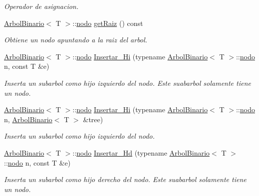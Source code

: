 \begin{DoxyCompactItemize}
\begin{DoxyCompactList}\small\item\em Operador de asignacion. \end{DoxyCompactList}\item 
\mbox{\label{classArbolBinario_a8ced95c7eae98ffd79eb46dcc99df523}} 
\hyperlink{classArbolBinario}{Arbol\+Binario}$<$ T $>$\+::\hyperlink{classArbolBinario_1_1nodo}{nodo} \hyperlink{classArbolBinario_a8ced95c7eae98ffd79eb46dcc99df523}{get\+Raiz} () const
\begin{DoxyCompactList}\small\item\em Obtiene un nodo apuntando a la raiz del arbol. \end{DoxyCompactList}\item 
\hyperlink{classArbolBinario}{Arbol\+Binario}$<$ T $>$\+::\hyperlink{classArbolBinario_1_1nodo}{nodo} \hyperlink{classArbolBinario_a82155da74eeeac7e52b9b0cc2f2d05f2}{Insertar\+\_\+\+Hi} (typename \hyperlink{classArbolBinario}{Arbol\+Binario}$<$ T $>$\+::\hyperlink{classArbolBinario_1_1nodo}{nodo} n, const T \&e)
\begin{DoxyCompactList}\small\item\em Inserta un subarbol como hijo izquierdo del nodo. Este suabarbol solamente tiene un nodo. \end{DoxyCompactList}\item 
\hyperlink{classArbolBinario}{Arbol\+Binario}$<$ T $>$\+::\hyperlink{classArbolBinario_1_1nodo}{nodo} \hyperlink{classArbolBinario_aa917f4b80d735b3494e1793de9457fb4}{Insertar\+\_\+\+Hi} (typename \hyperlink{classArbolBinario}{Arbol\+Binario}$<$ T $>$\+::\hyperlink{classArbolBinario_1_1nodo}{nodo} n, \hyperlink{classArbolBinario}{Arbol\+Binario}$<$ T $>$ \&tree)
\begin{DoxyCompactList}\small\item\em Inserta un subarbol como hijo izquierdo del nodo. \end{DoxyCompactList}\item 
\hyperlink{classArbolBinario}{Arbol\+Binario}$<$ T $>$\+::\hyperlink{classArbolBinario_1_1nodo}{nodo} \hyperlink{classArbolBinario_a1896b66e7b38f98ea4010e131998f376}{Insertar\+\_\+\+Hd} (typename \hyperlink{classArbolBinario}{Arbol\+Binario}$<$ T $>$\+::\hyperlink{classArbolBinario_1_1nodo}{nodo} n, const T \&e)
\begin{DoxyCompactList}\small\item\em Inserta un subarbol como hijo derecho del nodo. Este suabarbol solamente tiene un nodo. \end{DoxyCompactList}\item 

\end{DoxyCompactItemize}
